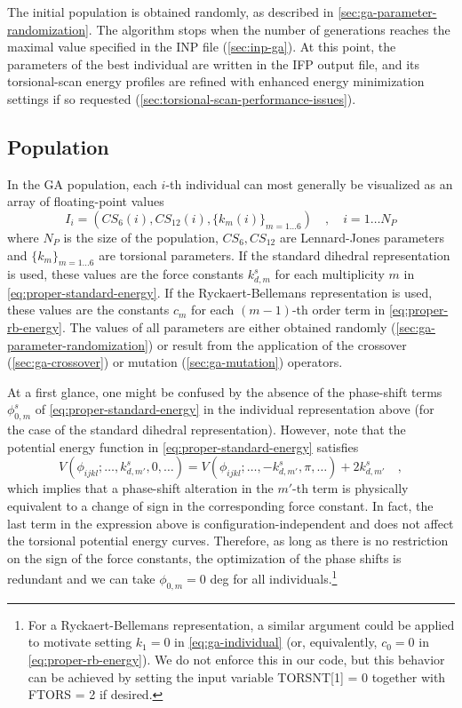 \documentclass[10pt,a4paper,openany]{memoir}
\numberwithin{equation}{section}
\begin{document}
The initial population is obtained randomly, as described in
\autoref{sec:ga-parameter-randomization}.  The algorithm stops when
the number of generations reaches the maximal value specified in the
INP file (\autoref{sec:inp-ga}).  At this point, the parameters of the
best individual are written in the IFP output file, and its
torsional-scan energy profiles are refined with enhanced energy
minimization settings if so requested (\autoref{sec:torsional-scan-performance-issues}).

\subsection{Population}
\label{sec:ga-population}

In the GA population, each $i$-th individual can most generally be visualized as an
array of floating-point values
\begin{equation}
  \label{eq:ga-individual}
  I_i = (CS_6(i), CS_{12}(i), \{k_m(i)\}_{m=1\ldots 6}) \quad , \quad i = 1 \ldots N_P
\end{equation}
where $N_P$ is the size of the population, $CS_6, CS_{12}$ are Lennard-Jones parameters and $\{k_m\}_{m=1\ldots 6}$ are torsional parameters.
If the standard dihedral representation is used, these values are the force constants $k_{d,m}^s$ for each multiplicity $m$ in \autoref{eq:proper-standard-energy}.
If the Ryckaert-Bellemans representation is used, these values are the constants $c_m$  for each $(m-1)$-th order term in \autoref{eq:proper-rb-energy}.
The values of all parameters are either obtained randomly (\autoref{sec:ga-parameter-randomization}) or result from the application of the crossover (\autoref{sec:ga-crossover}) or mutation (\autoref{sec:ga-mutation}) operators.

At a first glance, one might be confused by the absence of the phase-shift terms $\phi_{0,m}^s$ of \autoref{eq:proper-standard-energy} in the individual representation above (for the case of the standard dihedral representation).
However, note that the potential energy function in \autoref{eq:proper-standard-energy} satisfies
\begin{equation*}
  V(\phi_{ijkl}; \ldots,k_{d,m'}^s,0,\ldots) = V(\phi_{ijkl}; \ldots,-k_{d,m'}^s,\pi,\ldots) + 2k_{d,m'}^s\quad , 
\end{equation*}
which implies that a phase-shift alteration in the $m'$-th term is physically equivalent to a change of sign in the corresponding force constant.
In fact, the last term in the expression above is configuration-independent and does not affect the torsional potential energy curves.
Therefore, as long as there is no restriction on the sign of the force constants, the optimization of the phase shifts is redundant and we can take $\phi_{0,m} = 0$ deg for all individuals.\footnote{For a Ryckaert-Bellemans representation, a similar argument could be applied to motivate setting $k_1 = 0$ in \autoref{eq:ga-individual} (or, equivalently, $c_0 = 0$ in \autoref{eq:proper-rb-energy}).
  We do not enforce this in our code, but this behavior can be achieved by setting the input variable TORSNT[1] = 0 together with FTORS = 2 if desired.}
\end{document}

